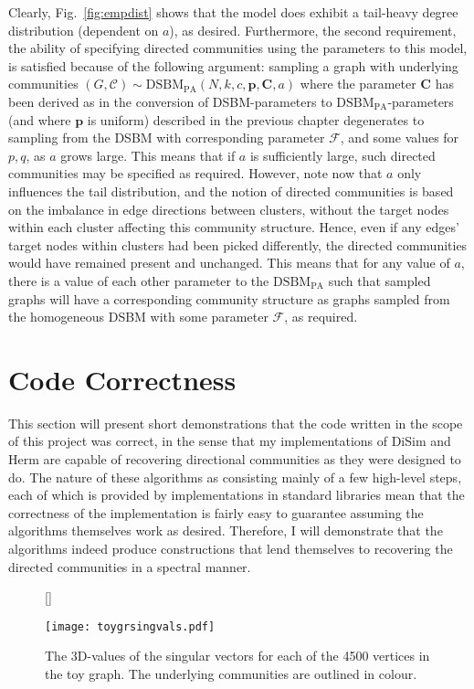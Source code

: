 Clearly, Fig.\ \ref{fig:empdist} shows that the model does exhibit a tail-heavy degree 
distribution (dependent on $a$), as desired. Furthermore, the second requirement, the ability of 
specifying directed communities using the parameters to this model, is satisfied because of the 
following argument: sampling a graph with underlying communities $(G, \mathcal{C}) \sim 
\mathrm{DSBM}_\mathrm{PA}(N, k, c, \mathbf{p}, \mathbf{C}, a)$ where the parameter $\mathbf{C}$ 
has been derived as in the conversion of DSBM-parameters to $\mathrm{DSBM}_\mathrm{PA}$-parameters 
(and where $\mathbf p$ is uniform) described in the previous chapter degenerates to sampling from 
the DSBM with corresponding parameter $\mathcal{F}$, and some values for $p,q$, as $a$ grows large. 
This means that if $a$ is sufficiently large, such directed communities may be specified as 
required. However, note now that $a$ only influences the tail distribution, and the notion of 
directed communities is based on the imbalance in edge directions between clusters, without the 
target nodes within each cluster affecting this community structure. Hence, even if any edges' 
target nodes within clusters had been picked differently, the directed communities would have 
remained present and unchanged. This means that for any value of $a$, there is a value of each 
other parameter to the $\mathrm{DSBM}_\mathrm{PA}$ such that sampled graphs will have a 
corresponding community structure as graphs sampled from the homogeneous DSBM with some parameter 
$\mathcal F$, as required.

\section{Code Correctness}

This section will present short demonstrations that the code written in the scope of this project 
was correct, in the sense that my implementations of DiSim and Herm are capable of recovering 
directional communities as they were designed to do. The nature of these algorithms as consisting 
mainly of a few high-level steps, each of which is provided by implementations in standard 
libraries mean that the correctness of the implementation is fairly easy to guarantee assuming the 
algorithms themselves work as desired. Therefore, I will demonstrate that the algorithms indeed 
produce constructions that lend themselves to recovering the directed communities in a spectral 
manner.

\begin{figure}
	[\FBwidth]{
	\caption{The 3D-values of the singular vectors for each of the 4500 vertices in the toy 
	graph. The underlying communities are outlined in colour.}
	\label{fig:toygrres}
	}
	{
	\texttt{[image: toygrsingvals.pdf]}
	}
\end{figure}


